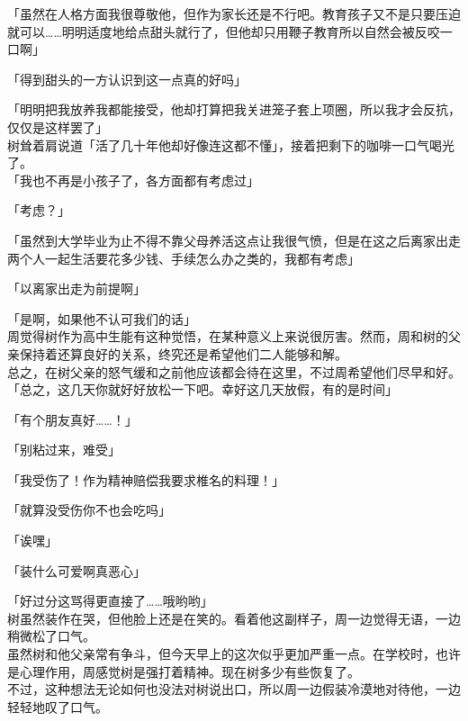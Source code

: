「虽然在人格方面我很尊敬他，但作为家长还是不行吧。教育孩子又不是只要压迫就可以……明明适度地给点甜头就行了，但他却只用鞭子教育所以自然会被反咬一口啊」

「得到甜头的一方认识到这一点真的好吗」

「明明把我放养我都能接受，他却打算把我关进笼子套上项圈，所以我才会反抗，仅仅是这样罢了」\\

树耸着肩说道「活了几十年他却好像连这都不懂」，接着把剩下的咖啡一口气喝光了。\\

「我也不再是小孩子了，各方面都有考虑过」

「考虑？」

「虽然到大学毕业为止不得不靠父母养活这点让我很气愤，但是在这之后离家出走两个人一起生活要花多少钱、手续怎么办之类的，我都有考虑」

「以离家出走为前提啊」

「是啊，如果他不认可我们的话」\\

周觉得树作为高中生能有这种觉悟，在某种意义上来说很厉害。然而，周和树的父亲保持着还算良好的关系，终究还是希望他们二人能够和解。\\

总之，在树父亲的怒气缓和之前他应该都会待在这里，不过周希望他们尽早和好。\\

「总之，这几天你就好好放松一下吧。幸好这几天放假，有的是时间」

「有个朋友真好……！」

「别粘过来，难受」

「我受伤了！作为精神赔偿我要求椎名的料理！」

「就算没受伤你不也会吃吗」

「诶嘿」

「装什么可爱啊真恶心」

「好过分这骂得更直接了……哦哟哟」\\

树虽然装作在哭，但他脸上还是在笑的。看着他这副样子，周一边觉得无语，一边稍微松了口气。\\

虽然树和他父亲常有争斗，但今天早上的这次似乎更加严重一点。在学校时，也许是心理作用，周感觉树是强打着精神。现在树多少有些恢复了。\\

不过，这种想法无论如何也没法对树说出口，所以周一边假装冷漠地对待他，一边轻轻地叹了口气。\\

